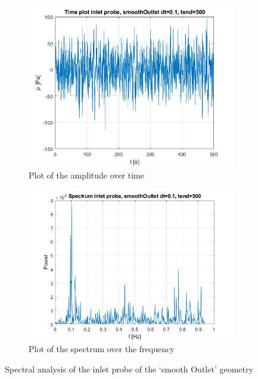 \documentclass[fleqn,12pt]{NTFD} %
\begin{document}
\begin{figure}[H]
\centering
\begin{subfigure}{.5\textwidth}
  \centering
  \includegraphics[width=.8\linewidth]{smooth_time_inlet.png}
  \caption{Plot of the amplitude over time}
  \label{fig:sub1}
\end{subfigure}%
\begin{subfigure}{.5\textwidth}
  \centering
  \includegraphics[width=.8\linewidth]{smooth_spectrum_inlet.png}
  \caption{Plot of the spectrum over the frequency}
  \label{fig:sub2}
\end{subfigure}
\caption{Spectral analysis of the inlet probe of the `smooth Outlet' geometry}
\label{fig:test}
\end{figure}
\end{document}
